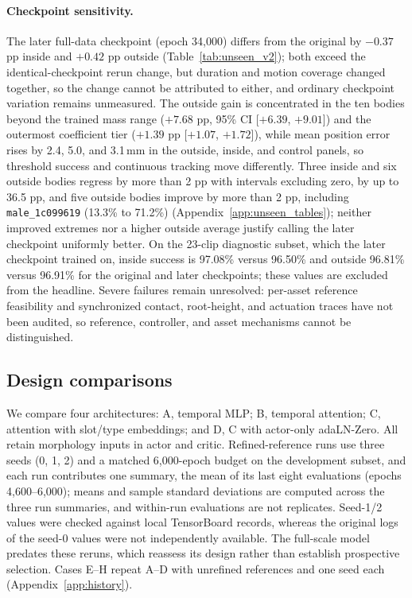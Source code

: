 \paragraph{Checkpoint sensitivity.}
The later full-data checkpoint (epoch 34,000) differs from the original by
$-0.37$ pp inside and $+0.42$ pp outside (Table~\ref{tab:unseen_v2}); both exceed
the identical-checkpoint rerun change, but duration and motion coverage changed
together, so the change cannot be attributed to either, and ordinary checkpoint
variation remains unmeasured. The outside gain is concentrated in the ten
bodies beyond the trained mass range ($+7.68$ pp, 95\% CI [$+6.39$, $+9.01$])
and the outermost coefficient tier ($+1.39$ pp [$+1.07$, $+1.72$]), while mean
position error rises by 2.4, 5.0, and 3.1\,mm in the outside, inside, and
control panels, so threshold success and continuous tracking move differently.
Three inside and six outside bodies regress by more than 2 pp with intervals
excluding zero, by up to 36.5 pp, and five outside bodies improve by more than
2 pp, including \texttt{male\_1c099619} (13.3\% to 71.2\%)
(Appendix~\ref{app:unseen_tables}); neither improved extremes nor a higher
outside average justify calling the later checkpoint uniformly better. On the
23-clip diagnostic subset, which the later checkpoint trained on, inside success
is 97.08\% versus 96.50\% and outside 96.81\% versus 96.91\% for the original and
later checkpoints; these values are excluded from the headline. Severe failures
remain unresolved: per-asset reference feasibility and synchronized contact,
root-height, and actuation traces have not been audited, so reference,
controller, and asset mechanisms cannot be distinguished.

\subsection{Design comparisons}\label{sec:design}

We compare four architectures: A, temporal MLP; B, temporal attention; C,
attention with slot/type embeddings; and D, C with actor-only adaLN-Zero. All
retain morphology inputs in actor and critic. Refined-reference runs use three
seeds (0, 1, 2) and a matched 6,000-epoch budget on the development subset, and
each run contributes one summary, the mean of its last eight evaluations
(epochs 4,600--6,000); means and sample standard deviations are computed across
the three run summaries, and within-run evaluations are not replicates. Seed-1/2
values were checked against local TensorBoard records, whereas the original logs
of the seed-0 values were not independently available. The full-scale model
predates these reruns, which reassess its design rather than establish
prospective selection. Cases E--H repeat A--D with unrefined references and one
seed each (Appendix~\ref{app:history}).

